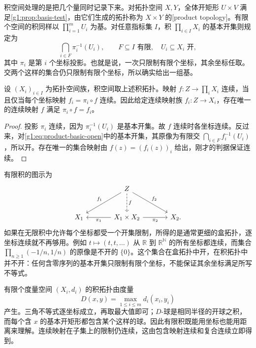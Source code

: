 积空间处理的是把几个量同时记录下来。对拓扑空间 \(X,Y\)，全体开矩形 \(U\times V\) 满足\cref{g1:prop:basis-test}，由它们生成的拓扑称为 \(X\times Y\) 的[product topology]。有限个空间的积同样以 \(\prod_{i=1}^mU_i\) 为基。对任意指标集 \(I\)，积 \(\prod_{i\in I}X_i\) 的基本开集则规定为
\begin{equation}\label{g1:eq:product-basic-open}
	\bigcap_{i\in F}\pi_i^{-1}(U_i),\qquad F\subseteq I\text{ 有限},\quad U_i\subseteq X_i\text{ 开},
\end{equation}
其中 \(\pi_i\) 是第 \(i\) 个坐标投影。也就是说，一次只限制有限个坐标，其余坐标任取。交两个这样的集合仍只限制有限个坐标，所以确实给出一组基。

\begin{proposition}\label{g1:prop:product-universal}
	设 \((X_i)_{i\in I}\) 为拓扑空间族，积空间取上述积拓扑。映射 \(f:Z\to\prod_iX_i\) 连续，当且仅当每个坐标映射 \(f_i=\pi_i\circ f\) 连续。因此给定连续映射族 \(f_i:Z\to X_i\)，存在唯一的连续映射 \(f\) 满足 \(\pi_i\circ f=f_i\)。
\end{proposition}
\begin{proof}
	投影 \(\pi_i\) 连续，因为 \(\pi_i^{-1}(U_i)\) 是基本开集。故 \(f\) 连续时各坐标连续。反过来，对\eqref{g1:eq:product-basic-open}中的基本开集，其原像为有限交 \(\bigcap_{i\in F}f_i^{-1}(U_i)\)，所以开。存在唯一的集合映射由 \(f(z)=(f_i(z))_i\) 给出，刚才的判据保证连续。
\end{proof}

有限积的图示为
\[
	\begin{tikzcd}[column sep=large,row sep=large]
		& Z \arrow[dl,"f_1"'] \arrow[d,dashed,"f"] \arrow[dr,"f_2"] & \\
		X_1 & X_1\times X_2 \arrow[l,"\pi_1"] \arrow[r,"\pi_2"'] & X_2 .
	\end{tikzcd}
\]
如果在无限积中允许每个坐标都受一个开集限制，所得的是通常更细的盒拓扑，逐坐标连续就不再够用。例如 \(t\mapsto(t,t,\ldots)\) 从 \(\mathbb R\) 到 \(\mathbb R^{\mathbb N}\) 的所有坐标都连续，而集合 \(\prod_{n\ge1}(-1/n,1/n)\) 的原像是不开的 \(\{0\}\)。这个集合在盒拓扑中开，在积拓扑中并不开：任何含零序列的基本开集只限制有限个坐标，不能保证其余坐标满足所写不等式。

有限个度量空间 \((X_i,d_i)\) 的积拓扑由度量
\[
	D(x,y)=\max_{1\le i\le m}d_i(x_i,y_i)
\]
产生。三角不等式逐坐标成立，再取最大值即可；\(D\)-球是相同半径的开球之积，而每个含 \(x\) 的基本开矩形都包含某个这样的球。因此有限积既能用坐标也能用距离来理解。连续映射在子集上的限制仍连续，这由包含映射连续和复合连续立即得到。

